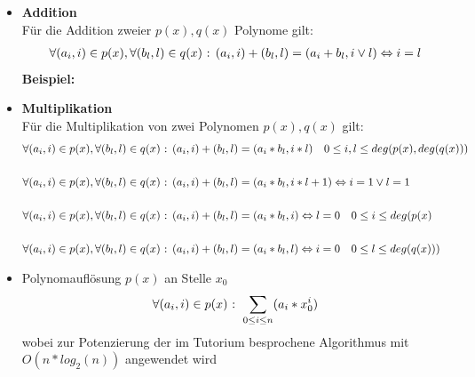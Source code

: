 \begin{itemize}
	\item \textbf{Addition}\\
		Für die Addition zweier $p(x),q(x)$ Polynome gilt: \\
		\begin{equation}
			\begin{aligned}
			 \forall (a_i,i)\in p(x), \forall(b_l,l)\in q(x)\text{ : } (a_i,i)+(b_l,l) = (a_i+b_l,i \vee l) \Leftrightarrow i=l \notag \\
			\end{aligned}
		\end{equation}
		\textbf{Beispiel:} \\		
		 
	\item \textbf{Multiplikation} \\
		Für die Multiplikation von zwei Polynomen $p(x),q(x)$ gilt: \\
		\begin{equation}
			\begin{aligned}
				\forall (a_i,i)\in p(x), \forall(b_l,l)\in q(x)\text{ : } (a_i,i)+(b_l,l) &= (a_i*b_l,i*l)\quad 0\leq i,l \leq deg(p(x),deg(q(x)))\notag \\
				\\
				\forall (a_i,i)\in p(x), \forall(b_l,l)\in q(x)\text{ : } (a_i,i)+(b_l,l) &= (a_i*b_l,i*l+1)\Leftrightarrow i=1 \vee l=1 \notag \\ 
				\\ 	
				\forall (a_i,i)\in p(x), \forall(b_l,l)\in q(x)\text{ : } (a_i,i)+(b_l,l) &= (a_i*b_l,i)\Leftrightarrow l=0 \quad 0\leq i \leq deg(p(x) \\
				\\
				\forall (a_i,i)\in p(x), \forall(b_l,l)\in q(x)\text{ : } (a_i,i)+(b_l,l) &= (a_i*b_l,l)\Leftrightarrow i=0 \quad 0\leq l \leq deg(q(x))) \\					
			\end{aligned}
		\end{equation}
	\item Polynomauflösung $p(x)$ an Stelle $x_0$ \\
		\begin{equation}
			\begin{aligned}
				\forall (a_i,i)\in p(x)\text{ : } \displaystyle \sum_{0\leq i \leq n}(a_i * x_0^i) \notag \\			
			\end{aligned}
		\end{equation}
		wobei zur Potenzierung der im Tutorium besprochene 	Algorithmus mit $ O(n*log_2(n))$ angewendet wird\\	
\end{itemize}

